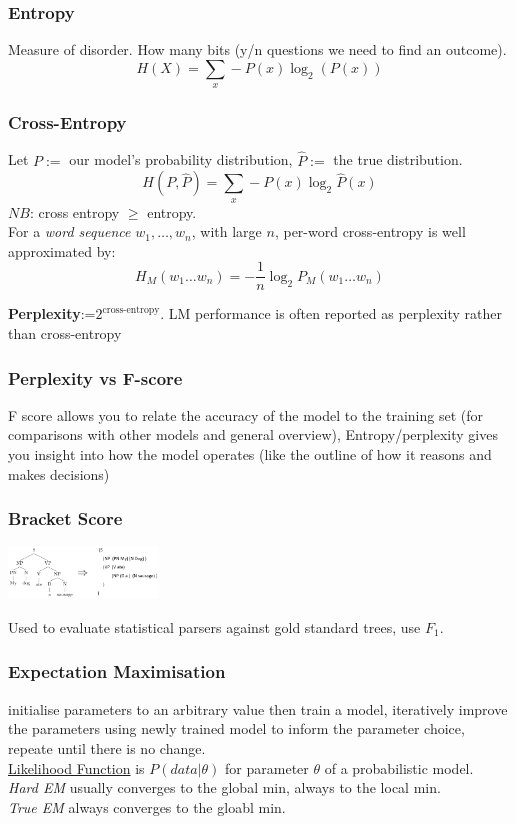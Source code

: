 \documentclass[8pt]{extarticle} %
\begin{document}
\begin{multicols*}{3}
\subsubsection*{Entropy}
Measure of disorder. How many bits (y/n questions we need to find an outcome).
$$H(X)=\sum_x-P(x) \log _2(P(x))$$

\subsubsection*{Cross-Entropy}
Let $P:=$ our model's probability distribution, $\hat{P}:=$ the true distribution.
$$H(P, \hat{P})=\sum_x-P(x) \log _2 \hat{P}(x)$$
$NB$: cross entropy $\geq$ entropy.\\
For a \textit{word sequence} $w_1, \ldots, w_n$, with large $n$, per-word cross-entropy is well approximated by:
$$H_M\left(w_1 \ldots w_n\right)=-\frac{1}{n} \log _2 P_M\left(w_1 \ldots w_n\right)$$

\textbf{Perplexity}:=$2^\text{cross-entropy}$.  LM performance is often reported as perplexity rather than cross-entropy

\subsubsection*{Perplexity vs F-score}
F score allows you to relate the accuracy of the model to the training set (for comparisons with other models and general overview), Entropy/perplexity gives you insight into how the model operates (like the outline of how it reasons and makes decisions)\\

\subsubsection*{Bracket Score}
\begin{center}
    \includegraphics[width=0.3\textwidth]{media/bracket-score.png}
\end{center}
Used to evaluate statistical parsers against gold standard trees, use $F_1$.

\subsubsection*{Expectation Maximisation} 
initialise parameters to an arbitrary value then train a model,
iteratively improve the parameters using newly trained model to 
inform the parameter choice, repeate until there is no change. \\
\underline{Likelihood Function} is $P(data|\theta)$ for parameter $\theta$ of a probabilistic model.\\
\textit{Hard EM} usually converges to the global min, always to the local min. \\
\textit{True EM} always converges to the gloabl min. \\


\end{multicols*}
\end{document}
